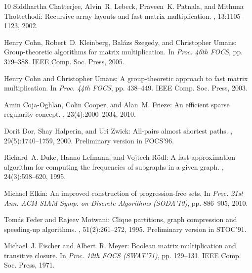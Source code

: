 \begin{thebibliography}{10}
{\sc Siddhartha Chatterjee, Alvin~R. Lebeck, Praveen~K. Patnala, and Mithuna
  Thottethodi}: Recursive array layouts and fast matrix multiplication.
, 13:1105--1123,
  2002.

{\sc Henry Cohn, Robert~D. Kleinberg, Bal{\'a}zs Szegedy, and Christopher
  Umans}: Group-theoretic algorithms for matrix multiplication.
\newblock In {\em Proc. 46th FOCS}, pp. 379--388. IEEE Comp. Soc. Press, 2005.

{\sc Henry Cohn and Christopher Umans}: A group-theoretic approach to fast
  matrix multiplication.
\newblock In {\em Proc. 44th FOCS}, pp. 438--449. IEEE Comp. Soc. Press, 2003.

{\sc Amin Coja-Oghlan, Colin Cooper, and Alan~M. Frieze}: An efficient sparse
  regularity concept.
, 23(4):2000--2034, 2010.
\newblock [\epfmtdoi{10.1137/080730160}]

{\sc Dorit Dor, Shay Halperin, and Uri Zwick}: All-pairs almost shortest paths.
, 29(5):1740--1759, 2000.
\newblock Preliminary version in FOCS'96.
\newblock [\epfmtdoi{10.1137/S0097539797327908}]

{\sc Richard~A. Duke, Hanno Lefmann, and Vojtech R{\"o}dl}: A fast
  approximation algorithm for computing the frequencies of subgraphs in a given
  graph.
, 24(3):598--620, 1995.
\newblock [\epfmtdoi{10.1137/S0097539793247634}]

{\sc Michael Elkin}: An improved construction of progression-free sets.
\newblock In {\em Proc. 21st Ann. ACM-SIAM Symp. on Discrete Algorithms
  (SODA'10)}, pp. 886--905, 2010.

{\sc Tom{\'a}s Feder and Rajeev Motwani}: Clique partitions, graph compression
  and speeding-up algorithms.
, 51(2):261--272, 1995.
\newblock Preliminary version in STOC'91.

{\sc Michael~J. Fischer and Albert~R. Meyer}: {B}oolean matrix multiplication
  and transitive closure.
\newblock In {\em Proc. 12th FOCS (SWAT'71)}, pp. 129--131. IEEE Comp. Soc.
  Press, 1971.


\end{thebibliography}
